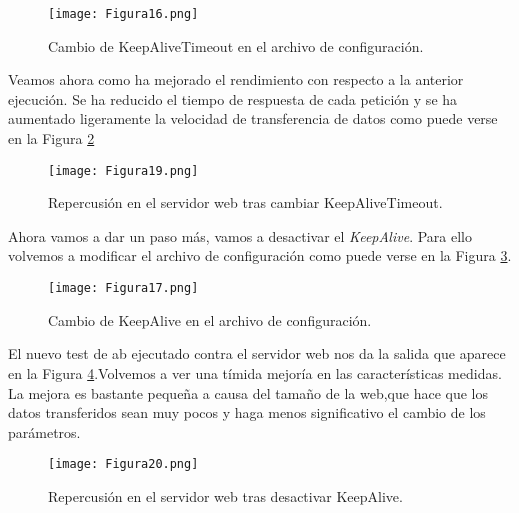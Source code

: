\begin{figure}[H] 
\centering
\texttt{[image: Figura16.png]}  
\caption{Cambio de KeepAliveTimeout en el archivo de configuración.}\label{fig:figura16}
\end{figure}

Veamos ahora como ha mejorado el rendimiento con respecto a la anterior ejecución. Se ha reducido el tiempo de respuesta de cada
petición y se ha aumentado ligeramente la velocidad de transferencia de datos como puede verse en la Figura \ref{fig:figura19} 

\begin{figure}[H] 
\centering
\texttt{[image: Figura19.png]}  
\caption{Repercusión en el servidor web tras cambiar KeepAliveTimeout.}\label{fig:figura19}
\end{figure}

Ahora vamos a dar un paso más, vamos a desactivar el \textit{KeepAlive}. Para ello volvemos a modificar el archivo de 
configuración como puede verse en la Figura \ref{fig:figura17}.

\begin{figure}[H] 
\centering
\texttt{[image: Figura17.png]}  
\caption{Cambio de KeepAlive en el archivo de configuración.}\label{fig:figura17}
\end{figure}

El nuevo test de ab ejecutado contra el servidor web nos da la salida que aparece en la Figura \ref{fig:figura20}.Volvemos a 
ver una tímida mejoría en las características medidas. La mejora es bastante pequeña a causa del tamaño de la web,que hace que
los datos transferidos sean muy pocos y haga menos significativo el cambio de los parámetros. 

\begin{figure}[H] 
\centering
\texttt{[image: Figura20.png]}  
\caption{Repercusión en el servidor web tras desactivar KeepAlive.}\label{fig:figura20}
\end{figure}


\newpage




